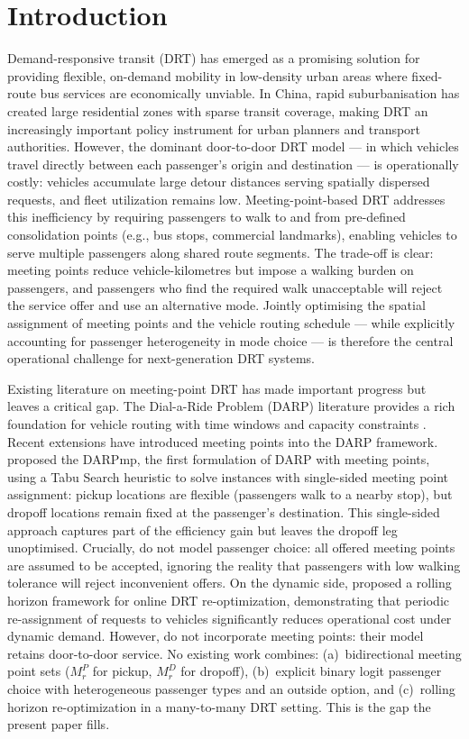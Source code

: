 \section{Introduction}
\label{sec:intro}

Demand-responsive transit (DRT) has emerged as a promising solution for providing
flexible, on-demand mobility in low-density urban areas where fixed-route bus services
are economically unviable.
In China, rapid suburbanisation has created large residential zones with sparse transit
coverage, making DRT an increasingly important policy instrument for urban planners
and transport authorities.
However, the dominant door-to-door DRT model — in which vehicles travel directly
between each passenger's origin and destination — is operationally costly: vehicles
accumulate large detour distances serving spatially dispersed requests, and fleet
utilization remains low.
Meeting-point-based DRT addresses this inefficiency by requiring passengers to walk
to and from pre-defined consolidation points (e.g., bus stops, commercial landmarks),
enabling vehicles to serve multiple passengers along shared route segments.
The trade-off is clear: meeting points reduce vehicle-kilometres but impose a walking
burden on passengers, and passengers who find the required walk unacceptable will
reject the service offer and use an alternative mode.
Jointly optimising the spatial assignment of meeting points and the vehicle routing
schedule — while explicitly accounting for passenger heterogeneity in mode choice —
is therefore the central operational challenge for next-generation DRT systems.

Existing literature on meeting-point DRT has made important progress but leaves a
critical gap.
The Dial-a-Ride Problem (DARP) literature provides a rich foundation for vehicle
routing with time windows and capacity constraints
\citep{cordeau2007,ho2018}.
Recent extensions have introduced meeting points into the DARP framework.
\citet{cortenbach2024} proposed the DARPmp, the first formulation of DARP with
meeting points, using a Tabu Search heuristic to solve instances with single-sided
meeting point assignment: pickup locations are flexible (passengers walk to a nearby
stop), but dropoff locations remain fixed at the passenger's destination.
This single-sided approach captures part of the efficiency gain but leaves the dropoff
leg unoptimised.
Crucially, \citet{cortenbach2024} do not model passenger choice: all offered meeting
points are assumed to be accepted, ignoring the reality that passengers with low
walking tolerance will reject inconvenient offers.
On the dynamic side, \citet{wu2025} proposed a rolling horizon framework for
online DRT re-optimization, demonstrating that periodic re-assignment of requests
to vehicles significantly reduces operational cost under dynamic demand.
However, \citet{wu2025} do not incorporate meeting points: their model retains
door-to-door service.
No existing work combines: (a)~bidirectional meeting point sets ($M_r^P$ for pickup,
$M_r^D$ for dropoff), (b)~explicit binary logit passenger choice with
heterogeneous passenger types and an outside option, and (c)~rolling horizon
re-optimization in a many-to-many DRT setting.
This is the gap the present paper fills.

